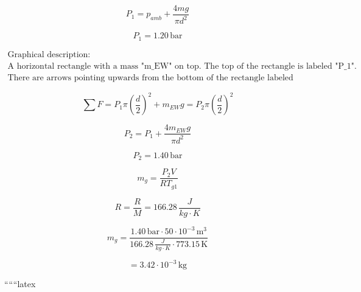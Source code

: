 \begin{equation*}
    P_1 = p_{amb} + \frac{4mg}{\pi d^2}
\end{equation*}

\begin{equation*}
    P_1 = 1.20 \, \text{bar}
\end{equation*}

\[
\begin{array}{c}
\text{Graphical description:} \\
\text{A horizontal rectangle with a mass "m_{EW}" on top. The top of the rectangle is labeled "P_1".} \\
\text{There are arrows pointing upwards from the bottom of the rectangle labeled "P_2".}
\end{array}
\]

\begin{equation*}
    \sum F = P_1 \pi \left( \frac{d}{2} \right)^2 + m_{EW} g = P_2 \pi \left( \frac{d}{2} \right)^2
\end{equation*}

\begin{equation*}
    P_2 = P_1 + \frac{4 m_{EW} g}{\pi d^2}
\end{equation*}

\begin{equation*}
    P_2 = 1.40 \, \text{bar}
\end{equation*}

\begin{equation*}
    m_g = \frac{P_2 V}{R T_{g1}}
\end{equation*}

\begin{equation*}
    R = \frac{R}{M} = 166.28 \, \frac{J}{kg \cdot K}
\end{equation*}

\begin{equation*}
    m_g = \frac{1.40 \, \text{bar} \cdot 50 \cdot 10^{-3} \, \text{m}^3}{166.28 \, \frac{J}{kg \cdot K} \cdot 773.15 \, \text{K}}
\end{equation*}

\begin{equation*}
    = 3.42 \cdot 10^{-3} \, \text{kg}
\end{equation*}

``````latex